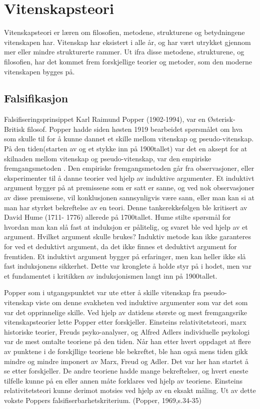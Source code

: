 \documentclass[
]{book}
\begin{document}
\hypertarget{vitenskapsteori}{%
\chapter{Vitenskapsteori}\label{vitenskapsteori}}

Vitenskapsteori er læren om filosofien, metodene, strukturene og betydningene vitenskapen har. Vitenskap har eksistert i alle år, og har vært utrykket gjennom mer eller mindre strukturerte rammer. Ut ifra disse metodene, strukturene, og filosofien, har det kommet frem forskjellige teorier og metoder, som den moderne vitenskapen bygges på.

\hypertarget{falsifikasjon}{%
\section{Falsifikasjon}\label{falsifikasjon}}

Falsifiseringsprinsippet Karl Raimund Popper (1902-1994), var en Østerisk-Britisk filosof. Popper hadde siden høsten 1919 bearbeidet spørsmålet om hva som skulle til for å kunne dannet et skille mellom vitenskap og pseudo-vitenskap. På den tiden(starten av og et stykke inn på 1900tallet) var det en aksept for at skilnaden mellom vitenskap og pseudo-vitenskap, var den empiriske fremgangsmetoden \citep{popper2002}. Den empiriske fremgangsmetoden går fra observasjoner, eller eksperimenter til å danne teorier ved hjelp av induktive argumenter. Et induktivt argument bygger på at premissene som er satt er sanne, og ved nok observasjoner av disse premissene, vil konklusjonen sannsynligvis være sann, eller man kan si at man har styrket bekreftelse av en teori. Denne tankerekkefølgen ble kritisert av David Hume (1711- 1776) allerede på 1700tallet. Hume stilte spørsmål for hvordan man kan slå fast at induksjon er pålitelig, og svaret ble ved hjelp av et argument. Hvilket argument skulle brukes? Induktiv metode kan ikke garanteres for ved et deduktivt argument, da det ikke finnes et deduktivt argument for fremtiden. Et induktivt argument bygger på erfaringer, men kan heller ikke slå fast induksjonens sikkerhet. Dette var kronglete å holde styr på i hodet, men var et fundamentet i kritikken av induksjonismen langt inn på 1900tallet.

Popper som i utgangspunktet var ute etter å skille vitenskap fra pseudo-vitenskap viste om denne svakheten ved induktive argumenter som var det som var det opprinnelige skille. Ved hjelp av datidens største og mest fremgangsrike vitenskapsteorier lette Popper etter forskjeller. Einsteins relativitetsteori, marx historiske teorier, Freuds psyko-analyser, og Alfred Adlers individuelle psykologi var de mest omtalte teoriene på den tiden. Når han etter hvert oppdaget at flere av punktene i de forskjllige teoriene ble bekreftet, ble han også mens tiden gikk mindre og mindre imponert av Marx, Freud og Adler. Det var her han startet å se etter forskjeller. De andre teoriene hadde mange bekreftelser, og hvert eneste tilfelle kunne på en eller annen måte forklares ved hjelp av teoriene. Einsteins relativitetsteori kunne derimot motsies ved hjelp av en eksakt måling. Ut av dette vokste Poppers falsifiserbarhetskriterium. (Popper, 1969,s.34-35)
\end{document}
